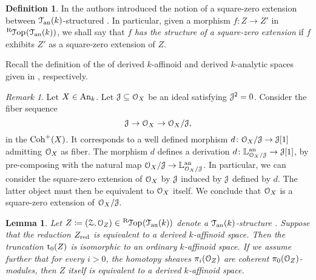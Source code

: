 \documentclass[10pt,a4paper,reqno]{amsart} %
\theoremstyle{plain}
\newtheorem{lem}[thm]{Lemma}
\theoremstyle{definition}
\newtheorem{defin}[thm]{Definition}
\theoremstyle{remark}
\newtheorem{rem}[thm]{Remark}
\numberwithin{equation}{section}
\begin{document}
\begin{defin}
    In \cite[Definition 5.41]{Porta_Yu_Representability} the authors introduced the notion of a square-zero extension between $\mathcal T_{\mathrm{an}}(k)$-structured
    \inftopoi. In particular, given a morphism $f \colon Z \to Z'$ in $\RTop(\cTank)$, we shall say that $f$ \emph{has the structure of
    a square-zero extension} if $f$ exhibits $Z'$ as a square-zero extension of $Z$.
\end{defin}

Recall the definition of the \infcats of derived $k$-affinoid and derived $k$-analytic spaces given
in \cite[Definition 7.3 and Definition 2.5.]{Porta_Yu_Derived_non-archimedean_analytic_spaces}, respectively.

\begin{rem} \label{rem:construction_of_nilpotent_extensions_as_square_zero_extensions}
    Let $X \in \mathrm{An}_k$. Let $\mathcal J \subseteq \mathcal O_X$ be an ideal satisfying $\mathcal J^2 = 0$. Consider the fiber sequence
        \[
            \mathcal J \to \mathcal O_X \to \mathcal O_X/\mathcal J,  
        \]
    in the \infcat $\mathrm{Coh}^+(X)$. It corresponds to a well defined morphism $d \colon \mathcal O_X / \mathcal J \to \mathcal J[1]$ admitting $\mathcal O_X$ as fiber. The morphism $d$ defines
    a derivation $d \colon \mathbb L^\mathrm{an}_{\mathcal O_X/ \mathcal J} \to \mathcal J[1]$, by pre-composing with the natural map $\mathcal O_X/ \mathcal J \to \mathbb L^\mathrm{an}_{\mathcal O_X/ \mathcal J}$.
    In particular, we can consider the square-zero extension of $\mathcal O_X$ by $\mathcal J$ induced by $\mathcal J$ defined by $d$. The latter object
    must then be equivalent to $\mathcal O_X$ itself. We conclude that $\mathcal O_X$ is a square-zero extension of $\mathcal O_X/\mathcal J$.
\end{rem}

\begin{lem} \label{lem:derived_k_analytic_space_whose_reduction_is_affinoid_is_also_affinoid}
    Let $Z \coloneqq (\cZ, \cO_Z) \in \RTop(\cTank)$ denote a $\mathcal T_{\mathrm{an}}(k)$-structure \inftopos. Suppose that the reduction
    $Z_{\mathrm{red}}$ is equivalent to a derived $k$-affinoid space. Then the truncation $\mathrm{t}_0(Z)$ is isomorphic to an ordinary $k$-affinoid space.
    If we assume further that for every $i>0$, the homotopy sheaves $\pi_i(\mathcal O_Z)$ are
    coherent $\pi_0(\mathcal O_Z)$-modules, then $Z$ itself is equivalent to a derived $k$-affinoid space.
\end{lem}
\end{document}
